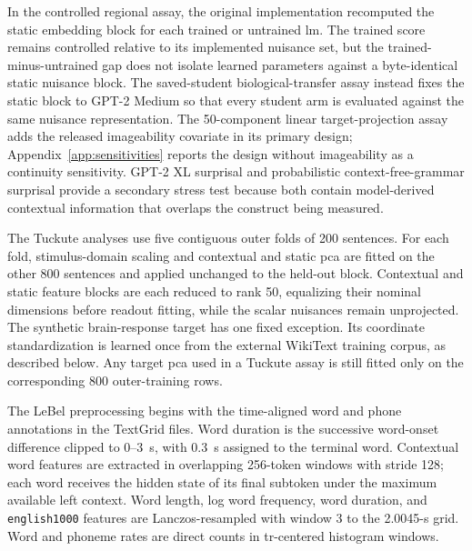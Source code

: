 In the controlled regional assay, the original implementation recomputed the static embedding block for each trained or untrained \ac{lm}.
The trained score remains controlled relative to its implemented nuisance set, but the trained-minus-untrained gap does not isolate learned parameters against a byte-identical static nuisance block.
The saved-student biological-transfer assay instead fixes the static block to GPT-2 Medium so that every student arm is evaluated against the same nuisance representation.
The 50-component linear target-projection assay adds the released imageability covariate in its primary design; Appendix~\ref{app:sensitivities} reports the design without imageability as a continuity sensitivity.
GPT-2 XL surprisal and probabilistic context-free-grammar surprisal provide a secondary stress test because both contain model-derived contextual information that overlaps the construct being measured. 

The Tuckute analyses use five contiguous outer folds of 200 sentences.
For each fold, stimulus-domain scaling and contextual and static \ac{pca} are fitted on the other 800 sentences and applied unchanged to the held-out block.
Contextual and static feature blocks are each reduced to rank 50, equalizing their nominal dimensions before readout fitting, while the scalar nuisances remain unprojected.
The synthetic brain-response target has one fixed exception.
Its coordinate standardization is learned once from the external WikiText training corpus, as described below.
Any target \ac{pca} used in a Tuckute assay is still fitted only on the corresponding 800 outer-training rows. 

The LeBel preprocessing begins with the time-aligned word and phone annotations in the TextGrid files.
Word duration is the successive word-onset difference clipped to 0--3~s, with 0.3~s assigned to the terminal word. 
Contextual word features are extracted in overlapping 256-token windows with stride 128; each word receives the hidden state of its final subtoken under the maximum available left context.
Word length, log word frequency, word duration, and \texttt{english1000} features are Lanczos-resampled with window 3 to the 2.0045-s grid. 
Word and phoneme rates are direct counts in \ac{tr}-centered histogram windows. 

